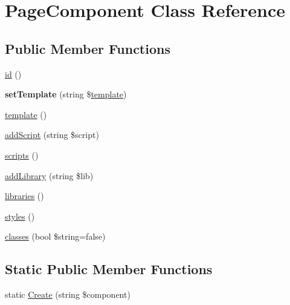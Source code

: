 \hypertarget{class_lora_1_1_page_component}{}\section{Page\+Component Class Reference}
\label{class_lora_1_1_page_component}
\subsection*{Public Member Functions}
\begin{DoxyCompactItemize}
\item 
\hyperlink{class_lora_1_1_page_component_a087060b582403885d08e89ad894ecc5d}{id} ()
\item 
\mbox{\label{class_lora_1_1_page_component_a30bd23795f307541c79fd2332dcf4af1}} 
{\bfseries set\+Template} (string \$\hyperlink{class_lora_1_1_page_component_a0b54c9d3801b331b75487ef78d98c06b}{template})
\item 
\hyperlink{class_lora_1_1_page_component_a0b54c9d3801b331b75487ef78d98c06b}{template} ()
\item 
\hyperlink{class_lora_1_1_page_component_aa1c1a80393db2b30ad535b13de050778}{add\+Script} (string \$script)
\item 
\hyperlink{class_lora_1_1_page_component_a3dc593f496b7dbf2e5e3c406cb5fd106}{scripts} ()
\item 
\hyperlink{class_lora_1_1_page_component_acd0b83bc65713449f479130693bf4dbc}{add\+Library} (string \$lib)
\item 
\hyperlink{class_lora_1_1_page_component_af34d5049c9cc4ab108d65218754b7429}{libraries} ()
\item 
\hyperlink{class_lora_1_1_page_component_a53d31780f290c90071a213e9f786abb3}{styles} ()
\item 
\hyperlink{class_lora_1_1_page_component_af6ac36c4e10b38c61aa0b45fa736bfc4}{classes} (bool \$string=false)
\end{DoxyCompactItemize}
\subsection*{Static Public Member Functions}
\begin{DoxyCompactItemize}
\item 
static \hyperlink{class_lora_1_1_page_component_ab6c03d0ec66cb31bfc74a784387cef33}{Create} (string \$component)
\end{DoxyCompactItemize}
